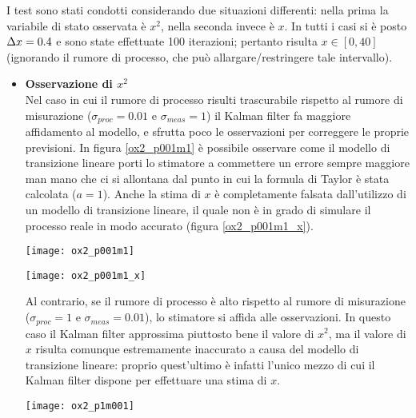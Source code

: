 I test sono stati condotti considerando due situazioni differenti: nella prima la variabile di stato osservata è $x^2$, nella seconda invece è $x$. In tutti i casi si è posto $\Delta x = 0.4$ e sono state effettuate 100 iterazioni; pertanto risulta $x \in [0,40]$ (ignorando il rumore di processo, che può allargare/restringere tale intervallo).
\begin{itemize}
\item \textbf{Osservazione di $x^2$}\\
Nel caso  in cui il rumore di processo risulti trascurabile rispetto al rumore di misurazione ($\sigma_{proc} = 0.01$ e $\sigma_{meas} = 1$) il Kalman filter fa maggiore affidamento al modello, e sfrutta poco le osservazioni per correggere le proprie previsioni. In figura \ref{ox2_p001m1} è possibile osservare come il modello di transizione lineare porti lo stimatore a commettere un errore sempre maggiore man mano che ci si allontana dal punto in cui la formula di Taylor è stata calcolata ($a = 1$).
Anche la stima di $x$ è completamente falsata dall'utilizzo di un modello di transizione lineare, il quale non è in grado di simulare il processo reale in modo accurato (figura \ref{ox2_p001m1_x}).

\begin{minipage}{\linewidth}
	\centering
	\texttt{[image: ox2\_p001m1]}
	\label{ox2_p001m1} 
\end{minipage}

\begin{minipage}{\linewidth}
	\centering
	\texttt{[image: ox2\_p001m1\_x]}
	\label{ox2_p001m1_x}
\end{minipage}

Al contrario, se il rumore di processo è alto rispetto al rumore di misurazione ($\sigma_{proc} = 1$ e $\sigma_{meas} = 0.01$), lo stimatore si affida alle osservazioni. In questo caso il Kalman filter approssima piuttosto bene il valore di $x^2$, ma il valore di $x$ risulta comunque estremamente inaccurato a causa del modello di transizione lineare: proprio quest'ultimo è infatti l'unico mezzo di cui il Kalman filter dispone per effettuare una stima di $x$.

\begin{minipage}{\linewidth}
	\centering
	\texttt{[image: ox2\_p1m001]}
	\label{ps_a0m100} 
\end{minipage}


\end{itemize}

